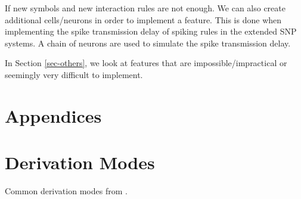 \documentclass[a4paper]{article}
\theoremstyle{definition}
\begin{document}
If new symbols and new interaction rules are not enough. We can also create additional cells/neurons
in order to implement a feature. This is done when implementing the spike transmission delay of
spiking rules in the extended SNP systems. A chain of neurons are used to simulate the spike
transmission delay.

In Section \ref{sec-others}, we look at features that are impossible/impractical or seemingly very
difficult to implement.



\appendix{}

\section*{Appendices}\label{app}
\section{Derivation Modes}\label{app-derivation}

Common derivation modes from \cite{freund-2007-ff-1}.
\end{document}
